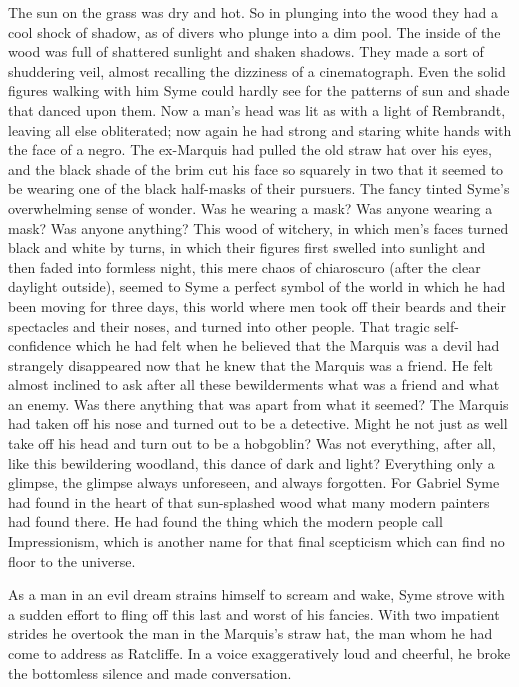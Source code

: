 The sun on the grass was dry and hot. So in plunging into the wood they had a cool shock of shadow, as of divers who plunge into a dim pool. The inside of the wood was full of shattered sunlight and shaken shadows. They made a sort of shuddering veil, almost recalling the dizziness of a cinematograph. Even the solid figures walking with him Syme could hardly see for the patterns of sun and shade that danced upon them. Now a man’s head was lit as with a light of Rembrandt, leaving all else obliterated; now again he had strong and staring white hands with the face of a negro. The ex-Marquis had pulled the old straw hat over his eyes, and the black shade of the brim cut his face so squarely in two that it seemed to be wearing one of the black half-masks of their pursuers. The fancy tinted Syme’s overwhelming sense of wonder. Was he wearing a mask? Was anyone wearing a mask? Was anyone anything? This wood of witchery, in which men’s faces turned black and white by turns, in which their figures first swelled into sunlight and then faded into formless night, this mere chaos of chiaroscuro (after the clear daylight outside), seemed to Syme a perfect symbol of the world in which he had been moving for three days, this world where men took off their beards and their spectacles and their noses, and turned into other people. That tragic self-confidence which he had felt when he believed that the Marquis was a devil had strangely disappeared now that he knew that the Marquis was a friend. He felt almost inclined to ask after all these bewilderments what was a friend and what an enemy. Was there anything that was apart from what it seemed? The Marquis had taken off his nose and turned out to be a detective. Might he not just as well take off his head and turn out to be a hobgoblin? Was not everything, after all, like this bewildering woodland, this dance of dark and light? Everything only a glimpse, the glimpse always unforeseen, and always forgotten. For Gabriel Syme had found in the heart of that sun-splashed wood what many modern painters had found there. He had found the thing which the modern people call Impressionism, which is another name for that final scepticism which can find no floor to the universe.

As a man in an evil dream strains himself to scream and wake, Syme strove with a sudden effort to fling off this last and worst of his fancies. With two impatient strides he overtook the man in the Marquis’s straw hat, the man whom he had come to address as Ratcliffe. In a voice exaggeratively loud and cheerful, he broke the bottomless silence and made conversation.


